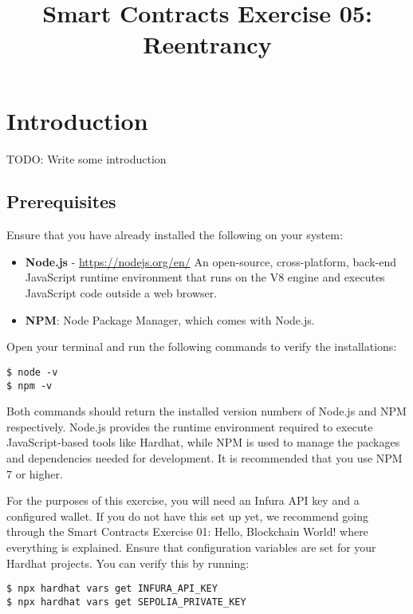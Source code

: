 \documentclass[12pt]{article}
\title{Smart Contracts Exercise 05: \\ Reentrancy}
\author{}
\date{}
\begin{document}
\maketitle
\section{Introduction}
TODO: Write some introduction

\subsection*{Prerequisites}

Ensure that you have already installed the following on your system:

\begin{itemize}
    \item \textbf{Node.js} - \url{https://nodejs.org/en/}
    An open-source, cross-platform, back-end JavaScript runtime environment that runs on the V8 engine and executes JavaScript code outside a web browser. 
    \item \textbf{NPM}: Node Package Manager, which comes with Node.js.
\end{itemize}

Open your terminal and run the following commands to verify the installations:

\begin{verbatim}
$ node -v
$ npm -v
\end{verbatim}

Both commands should return the installed version numbers of Node.js and NPM respectively. Node.js provides the runtime environment required to execute JavaScript-based tools like Hardhat, while NPM is used to manage the packages and dependencies needed for development. It is recommended that you use NPM 7 or higher.

For the purposes of this exercise, you will need an Infura API key and a configured wallet. If you do not have this set up yet, we recommend going through the Smart Contracts Exercise 01: Hello, Blockchain World! where everything is explained. Ensure that configuration variables are set for your Hardhat projects. You can verify this by running:

\begin{verbatim}
$ npx hardhat vars get INFURA_API_KEY
$ npx hardhat vars get SEPOLIA_PRIVATE_KEY
\end{verbatim}
\end{document}
